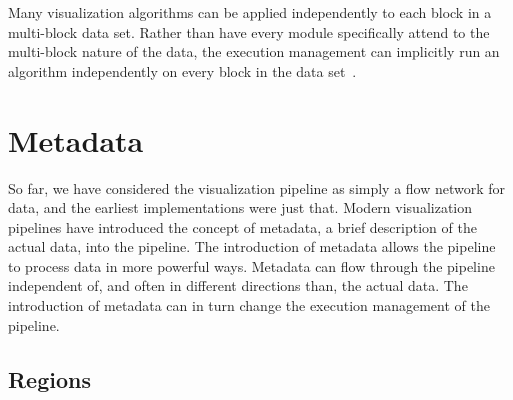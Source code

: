 \documentclass[journal,twocolumn,10pt,letterpaper,twoside]{IEEEtran}
\newcommand*{\lcite}[1]{~\cite{#1}}
\begin{document}
Many visualization algorithms can be applied independently to each block in
a multi-block data set.  Rather than have every module specifically
attend to the multi-block nature of the data, the execution management can
implicitly run an algorithm independently on every block in the data
set\lcite{VTKUsersGuide}.


\section{Metadata}
\label{sec:Metadata}

So far, we have considered the visualization pipeline as simply a flow
network for data, and the earliest implementations were just that.  Modern
visualization pipelines have introduced the concept of metadata, a brief
description of the actual data, into the pipeline.  The introduction of
metadata allows the pipeline to process data in more powerful ways.
Metadata can flow through the pipeline independent of, and often in
different directions than, the actual data.  The introduction of metadata
can in turn change the execution management of the pipeline.

\subsection{Regions}
\label{sec:Regions}
\end{document}
